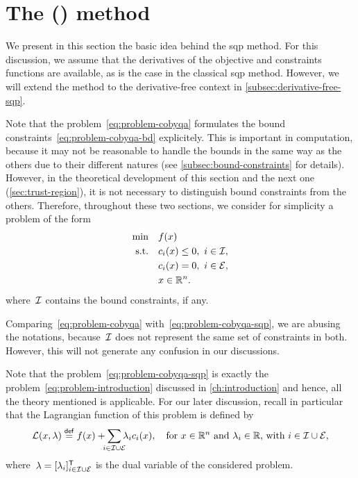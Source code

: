 \section{The  () method}

We present in this section the basic idea behind the \gls{sqp} method.
For this discussion, we assume that the derivatives of the objective and constraints functions are available, as is the case in the classical \gls{sqp} method.
However, we will extend the method to the derivative-free context in \cref{subsec:derivative-free-sqp}.

Note that the problem~\cref{eq:problem-cobyqa} formulates the bound constraints~\cref{eq:problem-cobyqa-bd} explicitely.
This is important in computation, because it may not be reasonable to handle the bounds in the same way as the others due to their different natures (see \cref{subsec:bound-constraints} for details).
However, in the theoretical development of this section and the next one (\cref{sec:trust-region}), it is not necessary to distinguish bound constraints from the others.
Therefore, throughout these two sections, we consider for simplicity a problem of the form
\begin{subequations}
    \label{eq:problem-cobyqa-sqp}
    \begin{align}
        \min        & \quad \obj(\iter) \label{eq:problem-cobyqa-sqp-obj}\\
        \text{s.t.} & \quad \con{i}(\iter) \le 0, ~ i \in \iub, \label{eq:problem-cobyqa-sqp-ub}\\
                    & \quad \con{i}(\iter) = 0, ~ i \in \ieq,\\
                    & \quad \iter \in \R^n. \nonumber
    \end{align}
\end{subequations}
where~$\mathcal{I}$ contains the bound constraints, if any.

\begin{remark}
    Comparing~\cref{eq:problem-cobyqa} with~\cref{eq:problem-cobyqa-sqp}, we are abusing the notations, because~$\mathcal{I}$ does not represent the same set of constraints in both.
    However, this will not generate any confusion in our discussions.
\end{remark}

Note that the problem~\cref{eq:problem-cobyqa-sqp} is exactly the problem~\cref{eq:problem-introduction} discussed in \cref{ch:introduction} and hence, all the theory mentioned is applicable.
For our later discussion, recall in particular that the Lagrangian function of this problem is defined by
\begin{equation*}
    \lag(\iter, \lm) \eqdef \obj(\iter) + \sum_{\mathclap{i \in \iub \cup \ieq}} \lm_i \con{i}(\iter), \quad \text{for~$\iter \in \R^n$ and~$\lm_i \in \R$, with~$i \in \iub \cup \ieq$,}
\end{equation*}
where~$\lm = [\lm_i]_{i \in \iub \cup \ieq}^{\T}$ is the dual variable of the considered problem.


